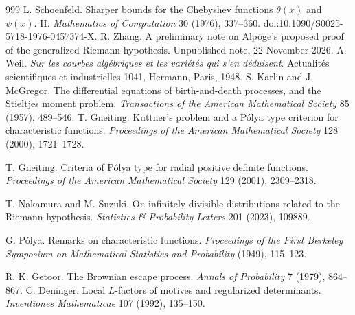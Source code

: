 \begin{thebibliography}{999}
 L. Schoenfeld. Sharper bounds for the Chebyshev functions $\theta(x)$ and $\psi(x)$. II. \emph{Mathematics of Computation} 30 (1976), 337--360. doi:10.1090/S0025-5718-1976-0457374-X.
 R. Zhang. A preliminary note on Alp\"oge's proposed proof of the generalized Riemann hypothesis. Unpublished note, 22 November 2026.
 A. Weil. \emph{Sur les courbes alg\'ebriques et les vari\'et\'es qui s'en d\'eduisent}. Actualit\'es scientifiques et industrielles 1041, Hermann, Paris, 1948. %
 S. Karlin and J. McGregor. The differential equations of birth-and-death processes, and the Stieltjes moment problem. \emph{Transactions of the American Mathematical Society} 85 (1957), 489--546.
 T. Gneiting. Kuttner's problem and a P\'olya type criterion for characteristic functions. \emph{Proceedings of the American Mathematical Society} 128 (2000), 1721--1728.

 T. Gneiting. Criteria of P\'olya type for radial positive definite functions. \emph{Proceedings of the American Mathematical Society} 129 (2001), 2309--2318.

 T. Nakamura and M. Suzuki. On infinitely divisible distributions related to the Riemann hypothesis. \emph{Statistics \& Probability Letters} 201 (2023), 109889.

 G. P\'olya. Remarks on characteristic functions. \emph{Proceedings of the First Berkeley Symposium on Mathematical Statistics and Probability} (1949), 115--123.

 R. K. Getoor. The Brownian escape process. \emph{Annals of Probability} 7 (1979), 864--867.
 C. Deninger. Local $L$-factors of motives and regularized determinants. \emph{Inventiones Mathematicae} 107 (1992), 135--150.


\end{thebibliography}
